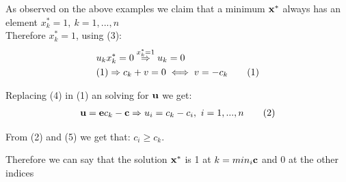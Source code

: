 \documentclass[12pt]{article}
\newcommand\numberthis{\addtocounter{equation}{1}\tag{\theequation}}	%
\begin{document}
\begin{enumerate}
\begin{enumerate}
				As observed on the above examples we claim that a minimum ${\bf x^*}$ always has an element $x^*_k = 1,\ k=1,...,n$\\
				
				Therefore $x^*_k=1$, using (3): \\
				\begin{align*}
					&u_kx^*_k=0 \overset{x^*_k=1}{\Rightarrow}u_k=0\\
					&(1)\Rightarrow c_k + v=0 \iff v=-c_k\numberthis
				\end{align*}
				
				Replacing (4) in (1) an solving for ${\bf u}$ we get:
				\begin{align*}
					{\bf u} = {\bf e}c_k-{\bf c} \Rightarrow u_i = c_k-c_i,\ i=1,...,n\numberthis
				\end{align*}
			
				From (2) and (5) we get that: $\displaystyle c_i\geq c_k$.
				
				Therefore we can say that the solution ${\bf x^*}$ is 1 at $k = min_i{\bf c}$ and 0 at the other indices
			\end{enumerate}
	\end{enumerate}
	
	
	
\end{document}
